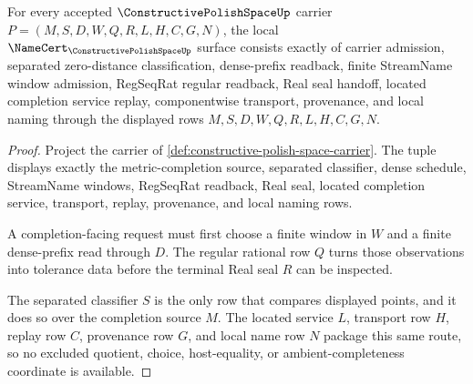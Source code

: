 \begin{theorem}\label{thm:constructive-polish-space-namecert-obligation-surface}
For every accepted $\ConstructivePolishSpaceUp$ carrier $P=(M,S,D,W,Q,R,L,H,C,G,N)$, the local $\NameCert_{\ConstructivePolishSpaceUp}$ surface consists exactly of carrier admission, separated zero-distance classification, dense-prefix readback, finite StreamName window admission, RegSeqRat regular readback, Real seal handoff, located completion service replay, componentwise transport, provenance, and local naming through the displayed rows $M,S,D,W,Q,R,L,H,C,G,N$.
\end{theorem}
\begin{proof}
Project the carrier of \autoref{def:constructive-polish-space-carrier}. The tuple displays exactly the metric-completion source, separated classifier, dense schedule, StreamName windows, RegSeqRat readback, Real seal, located completion service, transport, replay, provenance, and local naming rows.

A completion-facing request must first choose a finite window in $W$ and a finite dense-prefix read through $D$. The regular rational row $Q$ turns those observations into tolerance data before the terminal Real seal $R$ can be inspected.

The separated classifier $S$ is the only row that compares displayed points, and it does so over the completion source $M$. The located service $L$, transport row $H$, replay row $C$, provenance row $G$, and local name row $N$ package this same route, so no excluded quotient, choice, host-equality, or ambient-completeness coordinate is available.
\end{proof}

